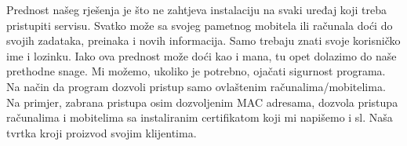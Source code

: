 		Prednost našeg rješenja je što ne zahtjeva instalaciju na svaki uređaj koji treba pristupiti servisu. Svatko može sa svojeg pametnog mobitela ili računala doći do svojih zadataka, preinaka i novih informacija. Samo trebaju znati svoje korisničko ime i lozinku. Iako ova prednost može doći kao i mana, tu opet dolazimo do naše prethodne snage. Mi možemo, ukoliko je potrebno, ojačati sigurnost programa. Na način da program dozvoli pristup samo ovlaštenim računalima/mobitelima. Na primjer, zabrana pristupa osim dozvoljenim MAC adresama, dozvola pristupa računalima i mobitelima sa instaliranim certifikatom koji mi napišemo i sl. Naša tvrtka kroji proizvod svojim klijentima.
		
		\eject
		
		

		
